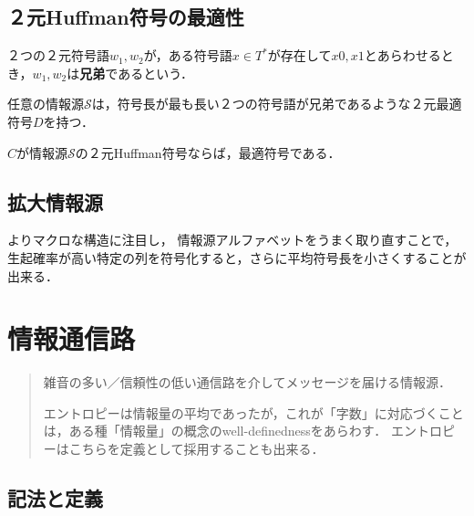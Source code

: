 \documentclass[uplatex,dvipdfmx]{jsreport}
\renewcommand{\S}{\mathcal{S}}
\begin{document}
\section{２元Huffman符号の最適性}

\begin{definition}[sibling]
    ２つの２元符号語$w_1,w_2$が，ある符号語$x\in T^*$が存在して$x0,x1$とあらわせるとき，$w_1,w_2$は\textbf{兄弟}であるという．
\end{definition}

\begin{lemma}
    任意の情報源$\S$は，符号長が最も長い２つの符号語が兄弟であるような２元最適符号$D$を持つ．
\end{lemma}

\begin{theorem}
    $C$が情報源$\S$の２元Huffman符号ならば，最適符号である．
\end{theorem}

\section{拡大情報源}

\begin{tcolorbox}[colframe=ForestGreen, colback=ForestGreen!10!white,breakable,colbacktitle=ForestGreen!40!white,coltitle=black,fonttitle=\bfseries\sffamily,
title=]
    よりマクロな構造に注目し，
    情報源アルファベットをうまく取り直すことで，生起確率が高い特定の列を符号化すると，さらに平均符号長を小さくすることが出来る．
\end{tcolorbox}

\chapter{情報通信路}

\begin{quotation}
    雑音の多い／信頼性の低い通信路を介してメッセージを届ける情報源．

    エントロピーは情報量の平均であったが，これが「字数」に対応づくことは，ある種「情報量」の概念のwell-definednessをあらわす．
    エントロピーはこちらを定義として採用することも出来る．
\end{quotation}

\section{記法と定義}
\end{document}
